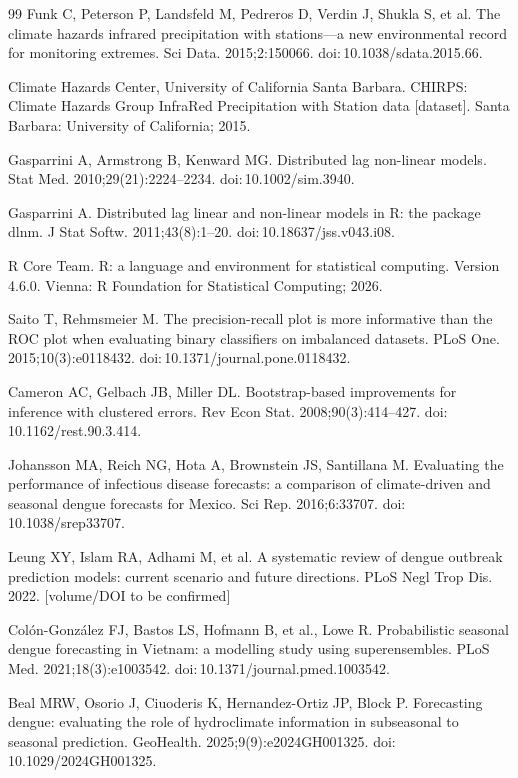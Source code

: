 \documentclass[11pt,a4paper]{article}
\begin{document}
\begin{thebibliography}{99}
 Funk C, Peterson P, Landsfeld M, Pedreros D, Verdin J, Shukla S, et al. The climate hazards infrared precipitation with stations---a new environmental record for monitoring extremes. Sci Data. 2015;2:150066. doi:\,10.1038/sdata.2015.66.

 Climate Hazards Center, University of California Santa Barbara. CHIRPS: Climate Hazards Group InfraRed Precipitation with Station data [dataset]. Santa Barbara: University of California; 2015.

 Gasparrini A, Armstrong B, Kenward MG. Distributed lag non-linear models. Stat Med. 2010;29(21):2224--2234. doi:\,10.1002/sim.3940.

 Gasparrini A. Distributed lag linear and non-linear models in R: the package dlnm. J Stat Softw. 2011;43(8):1--20. doi:\,10.18637/jss.v043.i08.

 R Core Team. R: a language and environment for statistical computing. Version 4.6.0. Vienna: R Foundation for Statistical Computing; 2026.

 Saito T, Rehmsmeier M. The precision-recall plot is more informative than the ROC plot when evaluating binary classifiers on imbalanced datasets. PLoS One. 2015;10(3):e0118432. doi:\,10.1371/journal.pone.0118432.

 Cameron AC, Gelbach JB, Miller DL. Bootstrap-based improvements for inference with clustered errors. Rev Econ Stat. 2008;90(3):414--427. doi:\,10.1162/rest.90.3.414.

 Johansson MA, Reich NG, Hota A, Brownstein JS, Santillana M. Evaluating the performance of infectious disease forecasts: a comparison of climate-driven and seasonal dengue forecasts for Mexico. Sci Rep. 2016;6:33707. doi:\,10.1038/srep33707.

 Leung XY, Islam RA, Adhami M, et al. A systematic review of dengue outbreak prediction models: current scenario and future directions. PLoS Negl Trop Dis. 2022. [volume/DOI to be confirmed]

 Col\'{o}n-Gonz\'{a}lez FJ, Bastos LS, Hofmann B, et al., Lowe R. Probabilistic seasonal dengue forecasting in Vietnam: a modelling study using superensembles. PLoS Med. 2021;18(3):e1003542. doi:\,10.1371/journal.pmed.1003542.

 Beal MRW, Osorio J, Ciuoderis K, Hernandez-Ortiz JP, Block P. Forecasting dengue: evaluating the role of hydroclimate information in subseasonal to seasonal prediction. GeoHealth. 2025;9(9):e2024GH001325. doi:\,10.1029/2024GH001325.

\end{thebibliography}
\endgroup
\end{document}
